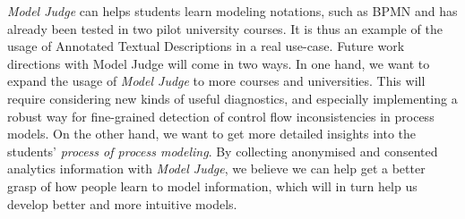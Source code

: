 

\emph{Model Judge} can helps students learn modeling notations, such as BPMN and
has already been tested in two pilot university courses. It is thus an example of
the usage of Annotated Textual Descriptions in a real use-case. Future
work directions with Model Judge will come in two ways. In one hand, we want to
expand the usage of \emph{Model Judge} to more courses and universities. This
will require considering new kinds of useful diagnostics, and especially
implementing a robust way for fine-grained detection of control flow
inconsistencies in process models. On the other hand, we want to get more
detailed insights into the students' \emph{process of process modeling}. By
collecting anonymised and consented analytics information with \emph{Model
  Judge}, we believe we can help get a better grasp of how people learn to model
information, which will in turn help us develop better and more intuitive
models.